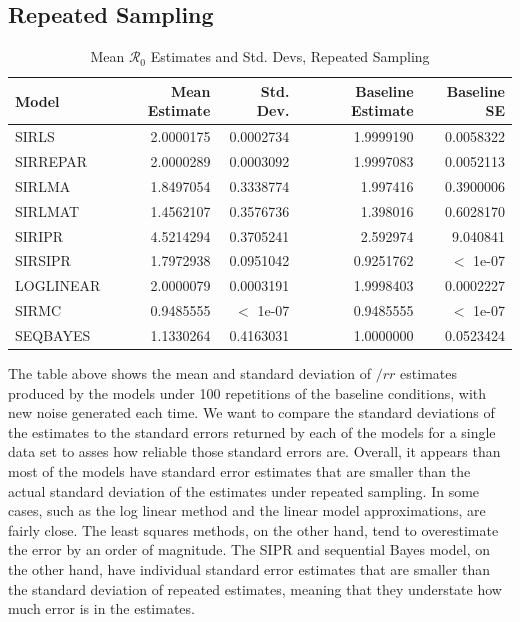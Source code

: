\message{ !name(draft_v13.tex)}\documentclass[12pt]{article}
\newcommand{\rr}{\ensuremath{\mathcal{R}_0}}
\begin{document}
\subsection{Repeated Sampling}

\begin{table}[H]
	
	\caption{\label{tab:}Mean $\rr$ Estimates and Std. Devs, Repeated Sampling}
	\centering
	\begin{tabular}[t]{l|r|r|r|r}
		\hline
		Model & Mean Estimate & Std. Dev. & Baseline Estimate & Baseline SE\\
		\hline
		SIRLS & 2.0000175 & 0.0002734 & 1.9999190 & 0.0058322\\
		\hline
		SIRREPAR & 2.0000289 & 0.0003092 & 1.9997083 & 0.0052113\\
		\hline
		SIRLMA & 1.8497054 & 0.3338774 & 1.997416 & 0.3900006\\
		\hline
		SIRLMAT & 1.4562107 & 0.3576736 & 1.398016 & 0.6028170 \\
		\hline
		SIRIPR & 4.5214294 & 0.3705241 & 2.592974 & 9.040841\\
		\hline
		SIRSIPR & 1.7972938 & 0.0951042 & 0.9251762 & $<$ 1e-07 \\
		\hline
		LOGLINEAR & 2.0000079 & 0.0003191 & 1.9998403 & 0.0002227\\
		\hline
		SIRMC & 0.9485555 & $<$ 1e-07 & 0.9485555 & $<$ 1e-07\\
		\hline
		SEQBAYES & 1.1330264 & 0.4163031 & 1.0000000 & 0.0523424\\
		\hline
	\end{tabular}
\end{table}

The table above shows the mean and standard deviation of $/rr$ estimates produced by the models under 100 repetitions of the baseline conditions, with new noise generated each time. We want to compare the standard deviations of the estimates to the standard errors returned by each of the models for a single data set to asses how reliable those standard errors are. Overall, it appears than most of the models have standard error estimates that are smaller than the actual standard deviation of the estimates under repeated sampling. In some cases, such as the log linear method and the linear model approximations, are fairly close. The least squares methods, on the other hand, tend to overestimate the error by an order of magnitude. The SIPR and sequential Bayes model, on the other hand, have individual standard error estimates that are smaller than the standard deviation of repeated estimates, meaning that they understate how much error is in the estimates.
\end{document}
